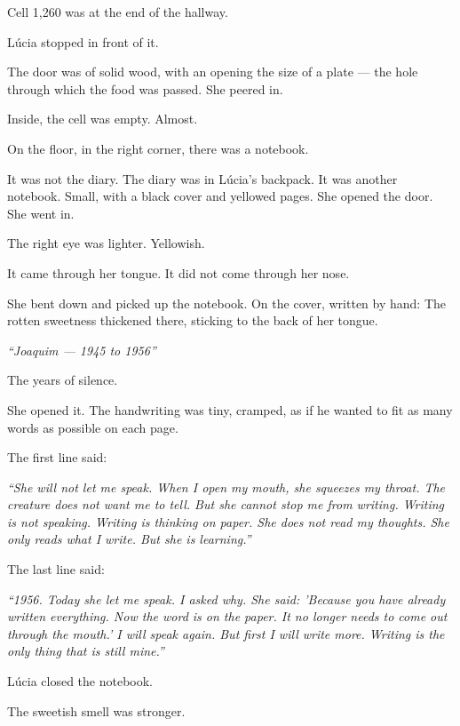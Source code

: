 \noindent Cell 1,260 was at the end of the hallway.

\noindent Lúcia stopped in front of it.

\noindent The door was of solid wood, with an opening the size of a plate --- the hole through which the food was passed. She peered in.

\noindent Inside, the cell was empty.
Almost.

\noindent On the floor, in the right corner, there was a notebook.

\noindent It was not the diary. The diary was in Lúcia's backpack. It was another notebook. Small, with a black cover and yellowed pages.
\noindent She opened the door. She went in.

\noindent The right eye was lighter. Yellowish.

\noindent It came through her tongue.
\noindent It did not come through her nose.

\noindent She bent down and picked up the notebook. On the cover, written by hand:
\noindent The rotten sweetness thickened there, sticking to the back of her tongue.

\noindent \textit{\textquotedblleft{}Joaquim --- 1945 to 1956\textquotedblright{}}

\noindent The years of silence.

\noindent She opened it. The handwriting was tiny, cramped, as if he wanted to fit as many words as possible on each page.

\noindent The first line said:

\noindent \textit{\textquotedblleft{}She will not let me speak. When I open my mouth, she squeezes my throat. The creature does not want me to tell. But she cannot stop me from writing. Writing is not speaking. Writing is thinking on paper. She does not read my thoughts. She only reads what I write. But she is learning.\textquotedblright{}}

\noindent The last line said:

\noindent \textit{\textquotedblleft{}1956. Today she let me speak. I asked why. She said: 'Because you have already written everything. Now the word is on the paper. It no longer needs to come out through the mouth.' I will speak again. But first I will write more. Writing is the only thing that is still mine.\textquotedblright{}}

\noindent Lúcia closed the notebook.

\noindent The sweetish smell was stronger.


